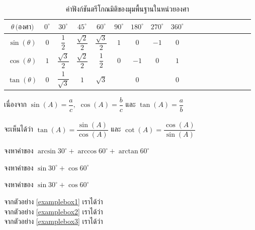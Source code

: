 \begin{table}[h]
	\centering
	\setlength{\tabcolsep}{8pt} 
	
	\begin{tabular}{| Sc | Sc | Sc | Sc | Sc | Sc | Sc | Sc | Sc |}
		\hline
		$\theta\,\text{(องศา)}$ 
		& $0^\circ$ 
		& $30^\circ$ 
		& $45^\circ$ 
		& $60^\circ$ 
		& $90^\circ$ 
		& $180^\circ$
		& $270^\circ$
		& $360^\circ$ \\
		\hline
		
		$\sin(\theta)$ 
		& $0$ 
		& $\dfrac{1}{2}$ 
		& $\dfrac{\sqrt{2}}{2}$ 
		& $\dfrac{\sqrt{3}}{2}$ 
		& $1$ 
		& $0$ 
		& $-1$ 
		& $0$ \\ 
		\hline
		
		$\cos(\theta)$ 
		& $1$ 
		& $\dfrac{\sqrt{3}}{2}$ 
		& $\dfrac{\sqrt{2}}{2}$ 
		& $\dfrac{1}{2}$ 
		& $0$ 
		& $-1$ 
		& $0$ 
		& $1$ \\
		\hline
		
		$\tan(\theta)$ 
		& $0$ 
		& $\dfrac{1}{\sqrt{3}}$ 
		& $1$ 
		& $\sqrt{3}$ 
		& 
		& $0$ 
		&  
		& $0$ \\
		\hline
	\end{tabular}
	\caption{ค่าฟังก์ชันตรีโกณมิติของมุมพื้นฐานในหน่วยองศา}
	\label{table1.1}
\end{table}

\begin{observationbox}
	เนื่องจาก $\sin(A)=\dfrac{a}{c},\,\,\cos(A)=\dfrac{b}{c}$ และ $\tan(A)=\dfrac{a}{b}$\\
	\vspace{0.5cm}\\
	จะเห็นได้ว่า $\tan(A)=\dfrac{\sin(A)}{\cos(A)}$ และ $\cot(A)=\dfrac{\cos(A)}{\sin(A)}$    
\end{observationbox}

\begin{examplebox} \label{examplebox1}
	จงหาค่าของ $\arcsin 30^\circ + \arccos 60^\circ +\arctan 60^\circ$
\end{examplebox}
\begin{examplebox} \label{examplebox2}
	จงหาค่าของ $\sin 30^\circ + \cos 60^\circ$
\end{examplebox}
\begin{examplebox} \label{examplebox3}
	จงหาค่าของ $\sin 30^\circ + \cos 60^\circ$
\end{examplebox}
จากตัวอย่าง \ref{examplebox1} เราได้ว่า\\
จากตัวอย่าง \ref{examplebox2} เราได้ว่า\\
จากตัวอย่าง \ref{examplebox3} เราได้ว่า

